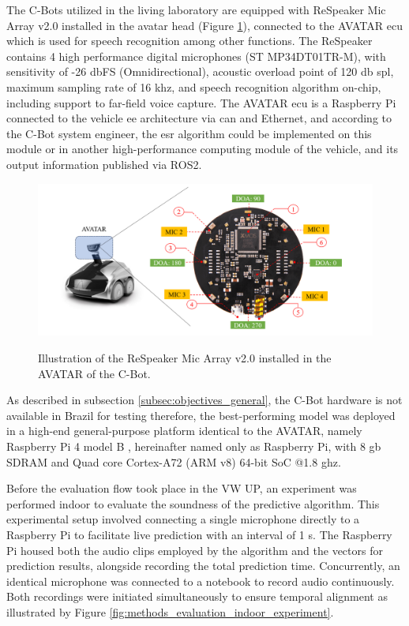 The C-Bots utilized in the living laboratory are equipped with ReSpeaker Mic Array v2.0 \cite{ReSpeake72} installed in the avatar head (Figure \ref{fig:methods_evaluation_AVATAR_ReSpeaker}), connected to the AVATAR \gls{ecu} which is used for speech recognition among other functions. The ReSpeaker contains 4 high performance digital microphones (ST MP34DT01TR-M), with sensitivity of -26 \gls{db}FS (Omnidirectional), acoustic overload point of 120 \gls{db} \gls{spl}, maximum sampling rate of 16 \gls{k}\gls{hz}, and speech recognition algorithm on-chip, including support to far-field voice capture. The AVATAR \gls{ecu} is a Raspberry Pi connected to the vehicle \gls{ee} architecture via \gls{can} and Ethernet, and according to the C-Bot system engineer, the \gls{esr} algorithm could be implemented on this module or in another high-performance computing module of the vehicle, and its output information published via ROS2. 

\begin{figure}[htbp]
    \raggedright
        \caption{Illustration of the ReSpeaker Mic Array v2.0 installed in the AVATAR of the C-Bot.}
        \includegraphics[width=.85\textwidth]{resources/images/050-methods/Methods_evaluation_microphone_ReSpeaker_Mic_Array_v2.0.png}
        \label{fig:methods_evaluation_AVATAR_ReSpeaker}
\end{figure}

As described in subsection \ref{subsec:objectives_general}, the C-Bot hardware is not available in Brazil for testing therefore, the best-performing model was deployed in a high-end general-purpose platform identical to the AVATAR, namely Raspberry Pi 4 model B \cite{Raspberry2023}, hereinafter named only as Raspberry Pi, with 8 \gls{g}\gls{b} SDRAM and Quad core Cortex-A72 (ARM v8) 64-bit SoC @1.8 \gls{g}\gls{hz}. 

Before the evaluation flow took place in the VW UP, an experiment was performed indoor to evaluate the soundness of the predictive algorithm. This experimental setup involved connecting a single microphone directly to a Raspberry Pi to facilitate live prediction with an interval of 1 \gls{s}. The Raspberry Pi housed both the audio clips employed by the algorithm and the vectors for prediction results, alongside recording the total prediction time. Concurrently, an identical microphone was connected to a notebook to record audio continuously. Both recordings were initiated simultaneously to ensure temporal alignment as illustrated by Figure \ref{fig:methods_evaluation_indoor_experiment}.

